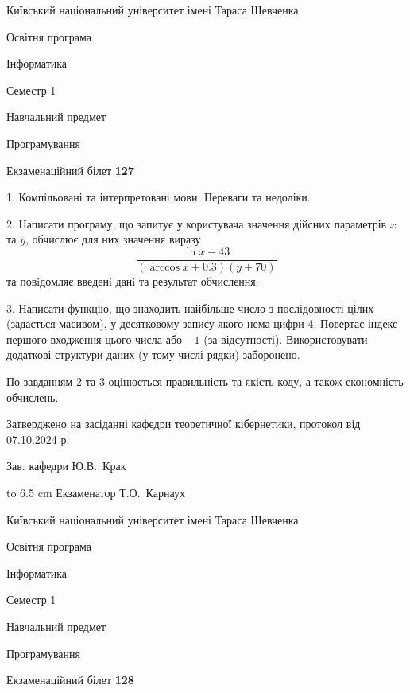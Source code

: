 \documentclass[12pt, ukrainian]{article}
\begin{document}
\newpage
{{\begin {scriptsize}\par
{ \center  Київський національний університет імені Тараса Шевченка \par}
{\parbox {5 cm}{Освітня програма \hfill}{\parbox {7 cm}{Інформатика\hfill}}\parbox {6 cm}{\hfill Семестр 1}}\par
{\parbox {5 cm} {Навчальний предмет \hfill}\parbox {7 cm}{Програмування \hfill}\parbox {6cm}{\hfill}\par}\vspace{-15pt} \end{scriptsize}}{\center Екзаменаційний білет \No \textbf { 127 }\par}}
{%
1. Компільовані та інтерпретовані мови. Переваги та недоліки.%
\par
2. Написати програму, що запитує у користувача значення дійсних параметрів $x$ та $y$, обчислює для них значення виразу 
$$\frac{\ln x - 43}{(\arccos x + 0.3) (y + 70)}$$ 
та повiдомляє введенi данi та результат обчислення.

\par
3. Написати функцію, що знаходить найбільше число з послідовності цілих (задається масивом), у десятковому запису якого нема цифри 4. Повертає індекс першого входження цього числа або $-1$ (за відсутності). Використовувати додаткові структури даних (у тому числі рядки) заборонено.

По завданням 2 та 3 оцінюється правильність та якість коду, а також економність обчислень.

}
{\smallskip\smallskip \begin {scriptsize} Затверджено на засіданні кафедри теоретичної кібернетики, протокол   від   07.10.2024 р.\par\smallskip\smallskip\smallskip\smallskip
{\parbox {6.5 cm} {Зав. кафедри \dotfill Ю.В.~Крак}}\hspace {0.7cm} {\hbox to 6.5 cm { Екзаменатор \dotfill Т.О.~Карнаух}} \end{scriptsize}}
\vspace{0.9cm}
{{\begin {scriptsize}\par
{ \center  Київський національний університет імені Тараса Шевченка \par}
{\parbox {5 cm}{Освітня програма \hfill}{\parbox {7 cm}{Інформатика\hfill}}\parbox {6 cm}{\hfill Семестр 1}}\par
{\parbox {5 cm} {Навчальний предмет \hfill}\parbox {7 cm}{Програмування \hfill}\parbox {6cm}{\hfill}\par}\vspace{-15pt} \end{scriptsize}}{\center Екзаменаційний білет \No \textbf { 128 }\par}}
\end{document}
